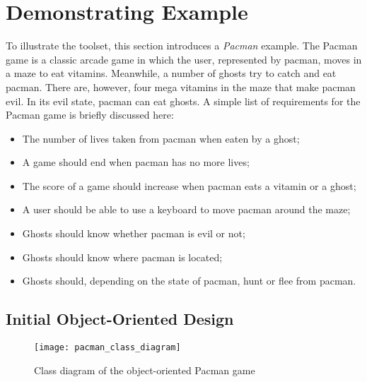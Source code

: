 \section{Demonstrating Example}
\label{sec:demonstratingexample}

To illustrate the \Compose* toolset, this section introduces a \emph{Pacman} example.
The Pacman game is a classic arcade game in which the user, represented by pacman, moves in a maze to eat vitamins.
Meanwhile, a number of ghosts try to catch and eat pacman.
There are, however, four mega vitamins in the maze that make pacman evil.
In its evil state, pacman can eat ghosts.
A simple list of requirements for the Pacman game is briefly discussed here:
\begin{itemize}[noitemsep]
  \item The number of lives taken from pacman when eaten by a ghost;
  \item A game should end when pacman has no more lives;
  \item The score of a game should increase when pacman eats a vitamin or a ghost;
  \item A user should be able to use a keyboard to move pacman around the maze;
  \item Ghosts should know whether pacman is evil or not;
  \item Ghosts should know where pacman is located;
  \item Ghosts should, depending on the state of pacman, hunt or flee from pacman.
\end{itemize}

\subsection{Initial Object-Oriented Design}

\begin{figure}[p]
  \centering
  \texttt{[image: pacman\_class\_diagram]}
  \caption{Class diagram of the object-oriented Pacman game}
  \label{fig:pacman_class_diagram}
\end{figure}


